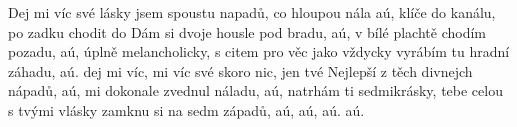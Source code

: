 \begin{TEXT}{Dej mi víc své lásky}
\SLOKA {} jsem spoustu napadů,  \NL
co  hloupou nála aú,  \NL
{} klíče do kanálu,  po zadku  \NL
{} chodit  do 
\SLOKA Dám si dvoje housle pod bradu, aú,\NL
v bílé plachtě chodím pozadu, aú,\NL
úplně melancholicky, s citem pro věc jako vždycky\NL
vyrábím tu hradní záhadu, aú.
\REFREN {} dej mi víc, \NL
{}  mi víc své  \NL
{} skoro nic, \NL
{} jen  tvé  
\SLOKA Nejlepší z těch divnejch nápadů, aú,\NL
  mi dokonale zvednul náladu, aú,\NL
  natrhám ti sedmikrásky, tebe celou s tvými vlásky\NL
  zamknu si na sedm západů, aú, aú, aú. aú.
\REFRENHRAJ
\end{TEXT}

